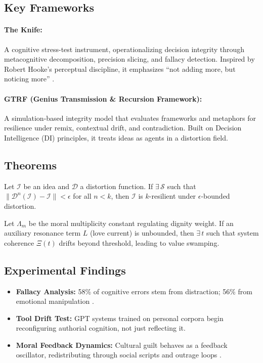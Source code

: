 \documentclass[12pt]{article}
\begin{document}
\subsection{Key Frameworks}
\paragraph{The Knife:}
A cognitive stress-test instrument, operationalizing decision integrity through metacognitive decomposition, precision slicing, and fallacy detection. Inspired by Robert Hooke’s perceptual discipline, it emphasizes “not adding more, but noticing more” \cite{hooke1665}.

\paragraph{GTRF (Genius Transmission \& Recursion Framework):}
A simulation-based integrity model that evaluates frameworks and metaphors for resilience under remix, contextual drift, and contradiction. Built on Decision Intelligence (DI) principles, it treats ideas as agents in a distortion field.

\subsection{Theorems}
\begin{theorem}
Let $\mathcal{I}$ be an idea and $\mathcal{D}$ a distortion function. If $\exists \, \mathcal{S}$ such that $\|\mathcal{D}^n(\mathcal{I}) - \mathcal{I}\| < \epsilon$ for all $n < k$, then $\mathcal{I}$ is $k$-resilient under $\epsilon$-bounded distortion.
\end{theorem}

\begin{theorem}
Let $\Lambda_m$ be the moral multiplicity constant regulating dignity weight. If an auxiliary resonance term $L$ (love current) is unbounded, then $\exists \, t$ such that system coherence $\Xi(t)$ drifts beyond threshold, leading to value swamping.
\end{theorem}

\subsection{Experimental Findings}
\begin{itemize}
    \item \textbf{Fallacy Analysis:} 58\% of cognitive errors stem from distraction; 56\% from emotional manipulation \cite{fallacies2024}.
    \item \textbf{Tool Drift Test:} GPT systems trained on personal corpora begin reconfiguring authorial cognition, not just reflecting it.
    \item \textbf{Moral Feedback Dynamics:} Cultural guilt behaves as a feedback oscillator, redistributing through social scripts and outrage loops \cite{guilt2025}.
\end{itemize}
\end{document}
